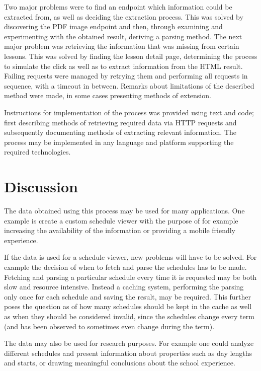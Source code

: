 \documentclass{article}
\begin{document}
	Two major problems were to find an endpoint which information could be extracted from, as well as deciding the extraction process. This was solved by discovering the PDF image endpoint and then, through examining and experimenting with the obtained result, deriving a parsing method. The next major problem was retrieving the information that was missing from certain lessons. This was solved by finding the lesson detail page, determining the process to simulate the click as well as to extract information from the HTML result. Failing requests were managed by retrying them and performing all requests in sequence, with a timeout in between. Remarks about limitations of the described method were made, in some cases presenting methods of extension.
	
	Instructions for implementation of the process was provided using text and code; first describing methods of retrieving required data via HTTP requests and subsequently documenting methods of extracting relevant information. The process may be implemented in any language and platform supporting the required technologies.
	
	\section{Discussion}
	The data obtained using this process may be used for many applications. One example is create a custom schedule viewer with the purpose of for example increasing the availability of the information or providing a mobile friendly experience.

	If the data is used for a schedule viewer, new problems will have to be solved. For example the decision of when to fetch and parse the schedules has to be made. Fetching and parsing a particular schedule every time it is requested may be both slow and resource intensive. Instead a caching system, performing the parsing only once for each schedule and saving the result, may be required. This further poses the question as of how many schedules should be kept in the cache as well as when they should be considered invalid, since the schedules change every term (and has been observed to sometimes even change during the term).
	
	The data may also be used for research purposes. For example one could analyze different schedules and present information about properties such as day lengths and starts, or drawing meaningful conclusions about the school experience.
	
\end{document}

